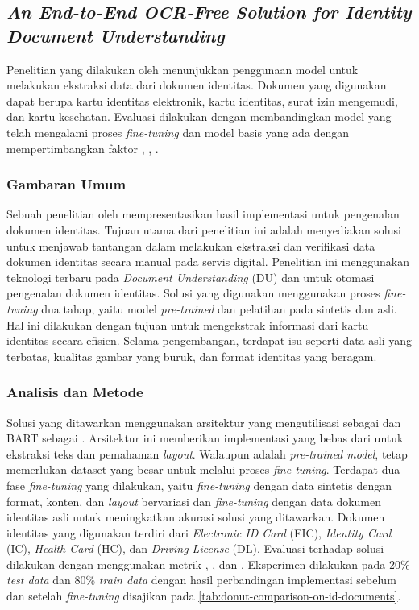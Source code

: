 \subsection{\textit{An End-to-End OCR-Free Solution for Identity Document Understanding}}
\label{sec:penelitian-2}
Penelitian yang dilakukan oleh \cite{carta2024end}  menunjukkan penggunaan model \donut{} untuk melakukan ekstraksi data dari dokumen identitas. Dokumen yang digunakan dapat berupa kartu identitas elektronik, kartu identitas, surat izin 
mengemudi, dan kartu kesehatan. Evaluasi dilakukan dengan membandingkan model yang telah mengalami proses \textit{fine-tuning} dan model basis yang ada dengan mempertimbangkan faktor \fscore, \mcerfull, \tedfull. 

\subsubsection{Gambaran Umum}
Sebuah penelitian oleh \cite{carta2024end} mempresentasikan hasil implementasi \donut{} untuk pengenalan dokumen identitas. Tujuan utama dari penelitian ini adalah menyediakan solusi untuk menjawab tantangan dalam melakukan ekstraksi dan verifikasi data dokumen identitas secara manual pada servis digital. Penelitian ini menggunakan teknologi terbaru pada \textit{Document Understanding} (DU) dan \ml{} untuk otomasi pengenalan dokumen identitas. Solusi yang digunakan menggunakan proses \textit{fine-tuning} dua tahap, yaitu model \textit{pre-trained} dan pelatihan pada \dataset{} sintetis dan asli. Hal ini dilakukan dengan tujuan untuk mengekstrak informasi dari kartu identitas secara efisien. Selama pengembangan, terdapat isu seperti data asli yang terbatas, kualitas gambar yang buruk, dan format identitas yang beragam. 

\subsubsection{Analisis dan Metode}
Solusi yang ditawarkan menggunakan arsitektur \transformer{} \donut{} yang mengutilisasi \swin{} sebagai \encoder{} dan BART sebagai \decoder{}. Arsitektur ini memberikan implementasi yang bebas dari \ocr{} untuk ekstraksi teks dan pemahaman \emph{layout}. Walaupun \donut{} adalah \textit{pre-trained model}, \donut{} tetap memerlukan dataset yang besar untuk melalui proses \emph{fine-tuning}. Terdapat dua fase \emph{fine-tuning} yang dilakukan, yaitu \emph{fine-tuning} dengan data sintetis dengan format, konten, dan \emph{layout} bervariasi dan \emph{fine-tuning} dengan data dokumen identitas asli untuk meningkatkan akurasi solusi yang ditawarkan. Dokumen identitas yang digunakan terdiri dari \emph{Electronic ID Card} (EIC), \emph{Identity Card} (IC), \emph{Health Card} (HC), dan \emph{Driving License} (DL). Evaluasi terhadap solusi dilakukan dengan menggunakan metrik \fscore, \mcerfull, dan \tedfull. Eksperimen dilakukan pada 20\% \emph{test data} dan 80\% \emph{train data} dengan hasil perbandingan implementasi \donut{} sebelum dan setelah \textit{fine-tuning} disajikan pada \autoref{tab:donut-comparison-on-id-documents}. 


